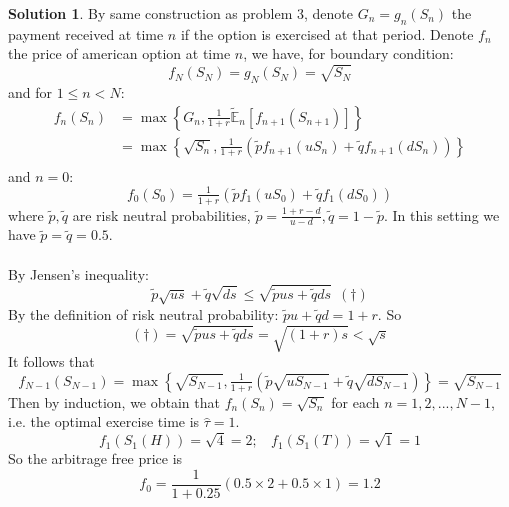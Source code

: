 \documentclass[a4paper, 10pt]{article}
\theoremstyle{definition}
\theoremstyle{hSol}
\newtheorem*{solution}{Solution}
\begin{document}
\begin{solution} By same construction as problem 3, denote $G_n=g_n(S_n)$ the payment received at time $n$ if the option is exercised at that period. Denote $f_n$ the price of american option at time $n$, we have, for boundary condition:
\begin{equation}
  f_N(S_N) = g_N(S_N) = \sqrt{S_N}
\end{equation}
and for $1\leq n<N$:
\begin{equation}
  \begin{split}
    f_n(S_n) &= \max\left\{G_n, \tfrac{1}{1+r}\tilde{\mathbb{E}}_n\left[f_{n+1}(S_{n+1})\right]\right\}\\
    &= \max\left\{\sqrt{S_n}, \tfrac{1}{1+r}\left(\tilde{p}f_{n+1}(uS_n)+\tilde{q}f_{n+1}(dS_n)\right)\right\}\\
  \end{split}
\end{equation}
and $n=0$:
\begin{equation}
  f_0(S_0) =\tfrac{1}{1+r}\left(\tilde{p}f_{1}(uS_0)+\tilde{q}f_{1}(dS_0)\right)
\end{equation}
where $\tilde{p}, \tilde{q}$ are risk neutral probabilities, $\tilde{p}=\frac{1+r-d}{u-d}, \tilde{q}=1- \tilde{p}$. In this setting we have $\tilde{p}=\tilde{q}=0.5$.\\
~\\
By Jensen's inequality:
\begin{equation}
  \tilde{p}\sqrt{us} + \tilde{q}\sqrt{ds} \leq \sqrt{\tilde{p}us + \tilde{q}ds}~~(\dag)
\end{equation}
By the definition of risk neutral probability:
$\tilde{p}u + \tilde{q}d = 1+r$. So
\begin{equation}
  (\dag) = \sqrt{\tilde{p}us + \tilde{q}ds} = \sqrt{(1+r)s} < \sqrt{s}
\end{equation}
It follows that 
\begin{equation}
  f_{N-1}(S_{N-1}) = \max\left\{\sqrt{S_{N-1}}, \tfrac{1}{1+r}\left(\tilde{p}\sqrt{uS_{N-1}} + \tilde{q}\sqrt{dS_{N-1}}\right)\right\} = \sqrt{S_{N-1}}
\end{equation}
Then by induction, we obtain that $f_n(S_n) = \sqrt{S_n}$ for each $n=1,2,...,N-1$, i.e. the optimal exercise time is $\hat{\tau}=1$.
$$
f_1(S_1(H)) = \sqrt{4} = 2;~~~~f_1(S_1(T)) = \sqrt{1} = 1
$$
So the arbitrage free price is
$$
f_0 = \frac{1}{1+0.25}(0.5\times 2 + 0.5\times 1) = 1.2
$$
\end{solution}
\end{document}
